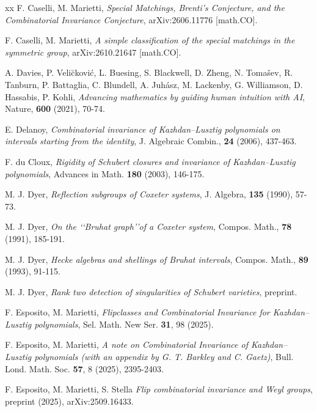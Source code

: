 \documentclass[12pt,reqno]{amsart}
\theoremstyle{plain}
\theoremstyle{definition}
\theoremstyle{remark}
\begin{document}
\begin{thebibliography}{xx}
F. Caselli, M. Marietti, {\em Special Matchings, Brenti's Conjecture, and the Combinatorial Invariance Conjecture}, arXiv:2606.11776 [math.CO].

F. Caselli, M. Marietti, {\em A simple classification of the special matchings in the symmetric group}, arXiv:2610.21647  [math.CO].

A. Davies, P. Veli\u ckovi\'c, L. Buesing, S. Blackwell, D. Zheng, N. Tomašev, R. Tanburn,  P. Battaglia, C. Blundell, A. Juhász, M. Lackenby, G. Williamson, D. Hassabis,  P. Kohli, {\em Advancing mathematics by guiding human intuition with AI}, Nature, {\bf 600} (2021), 70-74.

E. Delanoy, {\em Combinatorial invariance of Kazhdan--Lusztig polynomials on intervals starting from the identity},  J. Algebraic Combin., {\bf 24} (2006), 437-463.

F. du Cloux, {\em Rigidity of Schubert closures and invariance of Kazhdan--Lusztig polynomials},  Advances in Math. {\bf 180} (2003), 146-175.

M. J. Dyer, {\em Reflection subgroups of Coxeter systems}, J. Algebra, {\bf 135} (1990),  57-73. 

M. J. Dyer, {\em On the \lq\lq Bruhat graph\rq\rq of a Coxeter system}, Compos. Math., {\bf 78} (1991),  185-191. 

M. J. Dyer, {\em Hecke algebras and shellings of Bruhat intervals}, Compos. Math., {\bf 89} (1993),  91-115. 

M. J. Dyer, {\em Rank two detection of singularities of Schubert varieties}, preprint.

F. Esposito, M. Marietti, {\em Flipclasses and Combinatorial Invariance for Kazhdan--Lusztig polynomials}, Sel. Math. New Ser. {\bf 31}, 98 (2025). %

F. Esposito, M. Marietti, {\em A note on Combinatorial Invariance of Kazhdan--Lusztig polynomials (with an appendix by  G. T. Barkley and C. Gaetz)}, Bull. Lond. Math. Soc. {\bf 57}, 8 (2025), 2395-2403. %

F. Esposito, M. Marietti, S. Stella {\em Flip combinatorial invariance and Weyl groups},
preprint (2025), arXiv:2509.16433.


\end{thebibliography}
\end{document}
